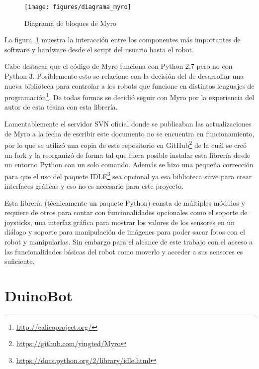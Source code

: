 \begin{figure}
    \centering
    \texttt{[image: figures/diagrama\_myro]}
    \caption{Diagrama de bloques de Myro}\label{fig:diagrama_myro}
\end{figure}

La figura~\ref{fig:diagrama_myro} muestra la interacción entre los componentes
más importantes de software y hardware desde el script del usuario hasta el
robot.

Cabe destacar que el código de Myro funciona con Python 2.7 pero no con
Python 3. Posiblemente esto se relacione con la decisión del \ipre{}
de desarrollar una nueva biblioteca para controlar a los robots que funcione
en distintos lenguajes de
programación\footnote{\url{http://calicoproject.org/}}. De todas formas se
decidió seguir con Myro por la experiencia del autor de esta tesina
con esta librería.

Lamentablemente el servidor SVN oficial donde se publicaban las
actualizaciones de Myro a la fecha de escribir este documento
no se encuentra en funcionamiento, por lo que se utilizó una
copia de este repositorio en
GitHub\footnote{\url{https://github.com/yingted/Myro}} de la cuál
se creó un fork y la reorganizó de forma tal que fuera posible instalar
esta librería desde un entorno Python con un solo comando.
Además se hizo
una pequeña corrección para que el uso del paquete
IDLE\footnote{\url{https://docs.python.org/2/library/idle.html}}
sea opcional ya esa biblioteca sirve para crear interfaces gráficas
y eso no es necesario para este proyecto.

Esta librería (técnicamente un paquete Python) consta de múltiples
módulos y requiere de otros para contar con funcionalidades opcionales
como el soporte de joysticks, una interfaz gráfica para mostrar
los valores de los sensores en un diálogo y soporte para manipulación
de imágenes para poder sacar fotos con el robot y manipularlas. Sin
embargo para el alcance de este trabajo con el acceso a las funcionalidades
básicas del robot como moverlo y acceder a sus sensores es suficiente.


\section{DuinoBot}\label{sec:duinobot}

